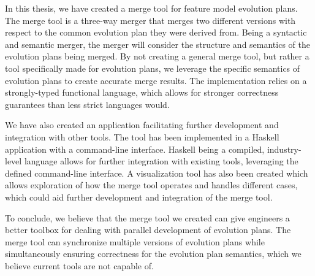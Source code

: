 \documentclass[a4paper,english]{ifimaster}
\begin{document}
In this thesis, we have created a merge tool for feature model evolution plans. The merge tool is a three-way merger that merges two different versions with respect to the common evolution plan they were derived from. Being a syntactic and semantic merger, the merger will consider the structure and semantics of the evolution plans being merged. By not creating a general merge tool, but rather a tool specifically made for evolution plans, we leverage the specific semantics of evolution plans to create accurate merge results. The implementation relies on a strongly-typed functional language, which allows for stronger correctness guarantees than less strict languages would.

We have also created an application facilitating further development and integration with other tools. The tool has been implemented in a Haskell application with a command-line interface. Haskell being a compiled, industry-level language allows for further integration with existing tools, leveraging the defined command-line interface. A visualization tool has also been created which allows exploration of how the merge tool operates and handles different cases, which could aid further development and integration of the merge tool.

To conclude, we believe that the merge tool we created can give engineers a better toolbox for dealing with parallel development of evolution plans. The merge tool can synchronize multiple versions of evolution plans while simultaneously ensuring correctness for the evolution plan semantics, which we believe current tools are not capable of.

\backmatter{}

\printbibliography
\end{document}
